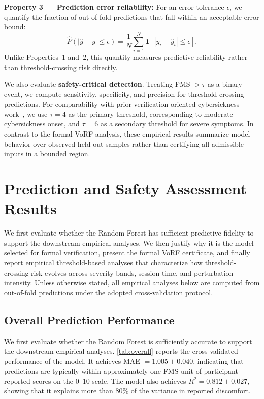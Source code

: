 \documentclass[review]{vgtc}              %
\begin{document}
\textbf{Property 3 --- Prediction error reliability:} For an error tolerance $\epsilon$, we quantify the fraction of out-of-fold predictions that fall within an acceptable error bound:
\begin{equation}
  \hat{P}(|\hat{y} - y| \leq \epsilon)
  =
  \frac{1}{N}
  \sum_{i=1}^{N}
  \mathbf{1}[|y_i - \hat{y}_i| \leq \epsilon].
  \label{eq:errorbound}
\end{equation}
Unlike Properties~1 and~2, this quantity measures predictive reliability rather than threshold-crossing risk directly.

We also evaluate \textbf{safety-critical detection}. Treating FMS $> \tau$ as a binary event, we compute sensitivity, specificity, and precision for threshold-crossing predictions. For comparability with prior verification-oriented cybersickness work~\cite{Wu2025BN}, we use $\tau = 4$ as the primary threshold, corresponding to moderate cybersickness onset, and $\tau = 6$ as a secondary threshold for severe symptoms. In contrast to the formal VoRF analysis, these empirical results summarize model behavior over observed held-out samples rather than certifying all admissible inputs in a bounded region.

\section{Prediction and Safety Assessment Results}\label{sec:results}

We first evaluate whether the Random Forest has sufficient predictive fidelity to support the downstream empirical analyses. We then justify why it is the model selected for formal verification, present the formal VoRF certificate, and finally report empirical threshold-based analyses that characterize how threshold-crossing risk evolves across severity bands, session time, and perturbation intensity. Unless otherwise stated, all empirical analyses below are computed from out-of-fold predictions under the adopted cross-validation protocol.

\subsection{Overall Prediction Performance}\label{sec:overall}

We first evaluate whether the Random Forest is sufficiently accurate to support the downstream empirical analyses. \cref{tab:overall} reports the cross-validated performance of the model. It achieves MAE $= 1.005 \pm 0.040$, indicating that predictions are typically within approximately one FMS unit of participant-reported scores on the 0--10 scale. The model also achieves $R^2 = 0.812 \pm 0.027$, showing that it explains more than 80\% of the variance in reported discomfort.
\end{document}
